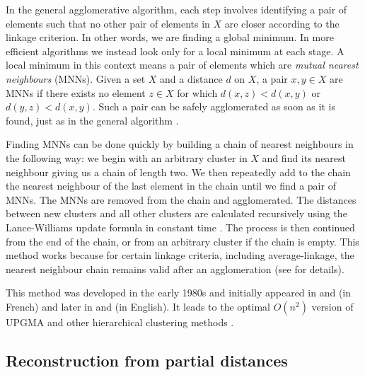 
In the general agglomerative algorithm, each step involves identifying a pair
of elements such that no other pair of elements in $X$ are closer according to
the linkage criterion.  In other words, we are finding a global minimum.  In
more efficient algorithms we instead look only for a local minimum at each
stage.  A local minimum in this context means a pair of elements which are
\textit{mutual nearest neighbours} (MNNs).  Given a set $X$ and a distance $d$
on $X$, a pair $x,y \in X$ are MNNs if there exists no element $z \in X$ for
which $d(x,z) < d(x,y)$ or $d(y,z) < d(x,y)$.  Such a pair can be safely
agglomerated as soon as it is found, just as in the general algorithm
\cite{murtagh2011methods}.

Finding MNNs can be done quickly by building a chain of nearest neighbours in
the following way: we begin with an arbitrary cluster in $X$ and find its
nearest neighbour giving us a chain of length two.  We then repeatedly add to
the chain the nearest neighbour of the last element in the chain until we find
a pair of MNNs.  The MNNs are removed from the chain and agglomerated.  The
distances between new clusters and all other clusters are calculated
recursively using the Lance-Williams update formula in constant time
\cite{lance66theory}.  The process is then continued from the end of the
chain, or from an arbitrary cluster if the chain is empty.  This method works
because for certain linkage criteria, including average-linkage, the nearest
neighbour chain remains valid after an agglomeration (see
\cite{gronau2007optimal} for details).

This method was developed in the early 1980s and initially appeared in
\cite{de1980classification} and \cite{juan1982programme} (in French) and later
in \cite{murtagh1983survey} and \cite{murtagh1984complexities} (in English).
It leads to the optimal $O(n^2)$ version of UPGMA and other hierarchical
clustering methods \cite{gronau2007optimal}.

\subsection{Reconstruction from partial distances}
\label{sec:constr-from-part}

